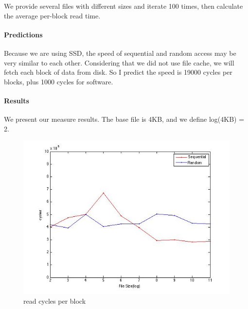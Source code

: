We provide several files with different sizes and iterate 100 times, then calculate  the average per-block read time.

\paragraph{Predictions}
Because we are using SSD, the speed of sequential and random access may be very similar to each other. Considering that we did not use file cache, we will fetch each block of data from disk. So I predict the speed is 19000 cycles per blocks, plus 1000 cycles for software.

\paragraph{Results}
We present our measure results. The base file is 4KB, and we define log(4KB) = 2.

\begin{figure}[htbp] %
   \centering
   \includegraphics[width=5in]{./pics/42.jpg} 
   \caption{read cycles per block}
   \label{fig:read cycles per block}
\end{figure}

